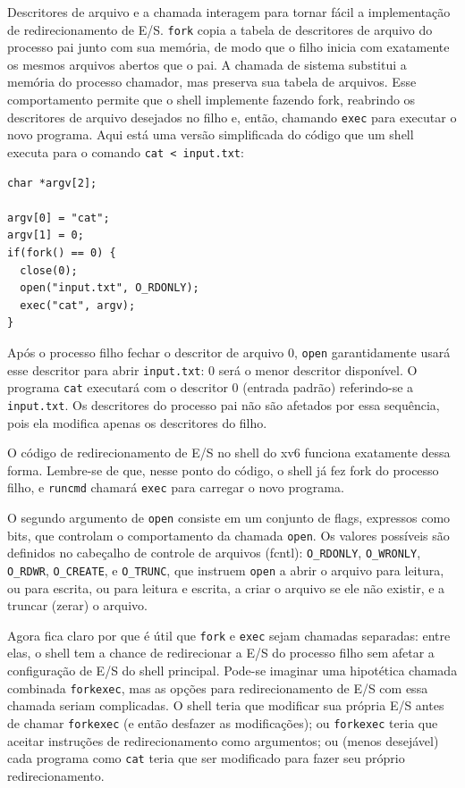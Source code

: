 Descritores de arquivo e a chamada
interagem para tornar fácil a implementação de redirecionamento de E/S.
\lstinline{fork}
copia a tabela de descritores de arquivo do processo pai junto com sua memória,
de modo que o filho inicia com exatamente os mesmos arquivos abertos que o pai.
A chamada de sistema
substitui a memória do processo chamador, mas preserva sua tabela de arquivos.
Esse comportamento permite que o shell
implemente  fazendo fork,
reabrindo os descritores de arquivo desejados no filho
e, então, chamando \lstinline{exec} para executar o novo programa.
Aqui está uma versão simplificada do código que um shell executa para o comando
\lstinline{cat < input.txt}:
\begin{lstlisting}[]
char *argv[2];

argv[0] = "cat";
argv[1] = 0;
if(fork() == 0) {
  close(0);
  open("input.txt", O_RDONLY);
  exec("cat", argv);
}
\end{lstlisting}
Após o processo filho fechar o descritor de arquivo 0,
\lstinline{open}
garantidamente usará esse descritor
para abrir
\lstinline{input.txt}:
0 será o menor descritor disponível.
O programa
\lstinline{cat}
executará com o descritor 0 (entrada padrão) referindo-se a
\lstinline{input.txt}.
Os descritores do processo pai não são afetados por essa
sequência, pois ela modifica apenas os descritores do filho.

O código de redirecionamento de E/S no shell do xv6 funciona exatamente dessa forma.
Lembre-se de que, nesse ponto do código, o shell já fez fork do
processo filho, e
\lstinline{runcmd}
chamará
\lstinline{exec}
para carregar o novo programa.

O segundo argumento de \lstinline{open} consiste em um conjunto de
flags, expressos como bits, que controlam o comportamento da chamada \lstinline{open}.
Os valores possíveis são definidos no cabeçalho de controle de arquivos (fcntl):
\lstinline{O_RDONLY},
\lstinline{O_WRONLY},
\lstinline{O_RDWR},
\lstinline{O_CREATE}, e
\lstinline{O_TRUNC},
que instruem \lstinline{open} a
abrir o arquivo para leitura,
ou para escrita,
ou para leitura e escrita,
a criar o arquivo se ele não existir,
e a truncar (zerar) o arquivo.

Agora fica claro por que é útil que
\lstinline{fork}
e
\lstinline{exec}
sejam chamadas separadas: entre elas, o shell tem a chance
de redirecionar a E/S do processo filho sem afetar a configuração de E/S do shell principal.
Pode-se imaginar uma hipotética chamada combinada
\lstinline{forkexec},
mas as opções para redirecionamento de E/S com essa chamada
seriam complicadas.
O shell teria que modificar sua própria E/S antes de chamar \lstinline{forkexec} (e então
desfazer as modificações); ou
\lstinline{forkexec} teria que aceitar instruções de redirecionamento como argumentos;
ou (menos desejável) cada programa como \lstinline{cat}
teria que ser modificado para fazer seu próprio redirecionamento.

